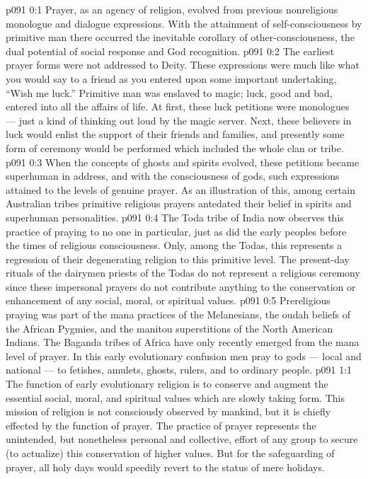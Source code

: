 \author{Chief of Midwayers}
\vs p091 0:1 Prayer, as an agency of religion, evolved from previous nonreligious monologue and dialogue expressions. With the attainment of self\hyp{}consciousness by primitive man there occurred the inevitable corollary of other\hyp{}consciousness, the dual potential of social response and God recognition.
\vs p091 0:2 The earliest prayer forms were not addressed to Deity. These expressions were much like what you would say to a friend as you entered upon some important undertaking, “Wish me luck.” Primitive man was enslaved to magic; luck, good and bad, entered into all the affairs of life. At first, these luck petitions were monologues --- just a kind of thinking out loud by the magic server. Next, these believers in luck would enlist the support of their friends and families, and presently some form of ceremony would be performed which included the whole clan or tribe.
\vs p091 0:3 When the concepts of ghosts and spirits evolved, these petitions became superhuman in address, and with the consciousness of gods, such expressions attained to the levels of genuine prayer. As an illustration of this, among certain Australian tribes primitive religious prayers antedated their belief in spirits and superhuman personalities.
\vs p091 0:4 The Toda tribe of India now observes this practice of praying to no one in particular, just as did the early peoples before the times of religious consciousness. Only, among the Todas, this represents a regression of their degenerating religion to this primitive level. The present\hyp{}day rituals of the dairymen priests of the Todas do not represent a religious ceremony since these impersonal prayers do not contribute anything to the conservation or enhancement of any social, moral, or spiritual values.
\vs p091 0:5 Prereligious praying was part of the mana practices of the Melanesians, the oudah beliefs of the African Pygmies, and the manitou superstitions of the North American Indians. The Baganda tribes of Africa have only recently emerged from the mana level of prayer. In this early evolutionary confusion men pray to gods --- local and national --- to fetishes, amulets, ghosts, rulers, and to ordinary people.
\vs p091 1:1 The function of early evolutionary religion is to conserve and augment the essential social, moral, and spiritual values which are slowly taking form. This mission of religion is not consciously observed by mankind, but it is chiefly effected by the function of prayer. The practice of prayer represents the unintended, but nonetheless personal and collective, effort of any group to secure (to actualize) this conservation of higher values. But for the safeguarding of prayer, all holy days would speedily revert to the status of mere holidays.

